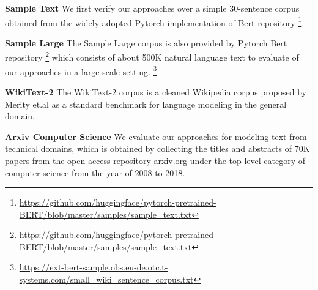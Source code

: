 


\noindent \textbf{Sample Text} 
We first verify our approaches over a simple 30-sentence corpus
obtained from the widely adopted Pytorch implementation of Bert repository \footnote{\url{https://github.com/huggingface/pytorch-pretrained-BERT/blob/master/samples/sample_text.txt}}.


\noindent \textbf{Sample Large}
The Sample Large corpus is also provided by Pytorch Bert repository  \footnote{\url{https://github.com/huggingface/pytorch-pretrained-BERT/blob/master/samples/sample_text.txt}}
which consists of about 500K natural language text to evaluate of our approaches in a large scale setting.
\footnote{\url{https://ext-bert-sample.obs.eu-de.otc.t-systems.com/small_wiki_sentence_corpus.txt}}

\noindent \textbf{WikiText-2} 
The WikiText-2 corpus is a cleaned Wikipedia corpus proposed by Merity et.al \cite{merity2016pointer} as a standard benchmark for language modeling in the general domain. 

\noindent \textbf{Arxiv Computer Science} We evaluate our approaches for modeling text from technical domains, 
which is obtained by collecting the titles and abstracts of 70K papers from the open access repository \url{arxiv.org} under the top level category of computer science from the year of 2008 to 2018. 


